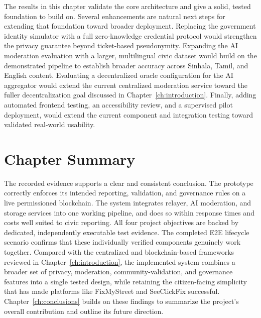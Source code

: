The results in this chapter validate the core architecture and give a solid, tested foundation to build on. Several enhancements are natural next steps for extending that foundation toward broader deployment. Replacing the government identity simulator with a full zero-knowledge credential protocol would strengthen the privacy guarantee beyond ticket-based pseudonymity. Expanding the AI moderation evaluation with a larger, multilingual civic dataset would build on the demonstrated pipeline to establish broader accuracy across Sinhala, Tamil, and English content. Evaluating a decentralized oracle configuration for the AI aggregator would extend the current centralized moderation service toward the fuller decentralization goal discussed in Chapter~\ref{ch:introduction}. Finally, adding automated frontend testing, an accessibility review, and a supervised pilot deployment, would extend the current component and integration testing toward validated real-world usability. 
\section{Chapter Summary}
\label{sec:findings-summary}

The recorded evidence supports a clear and consistent conclusion. The prototype correctly enforces its intended reporting, validation, and governance rules on a live permissioned blockchain. The system integrates relayer, AI moderation, and storage services into one working pipeline, and does so within response times and costs well suited to civic reporting. All four project objectives are backed by dedicated, independently executable test evidence. The completed \ac{E2E} lifecycle scenario confirms that these individually verified components genuinely work together. Compared with the centralized and blockchain-based frameworks reviewed in Chapter~\ref{ch:introduction}, the implemented system combines a broader set of privacy, moderation, community-validation, and governance features into a single tested design, while retaining the citizen-facing simplicity that has made platforms like FixMyStreet and SeeClickFix successful. Chapter~\ref{ch:conclusions} builds on these findings to summarize the project's overall contribution and outline its future direction.
